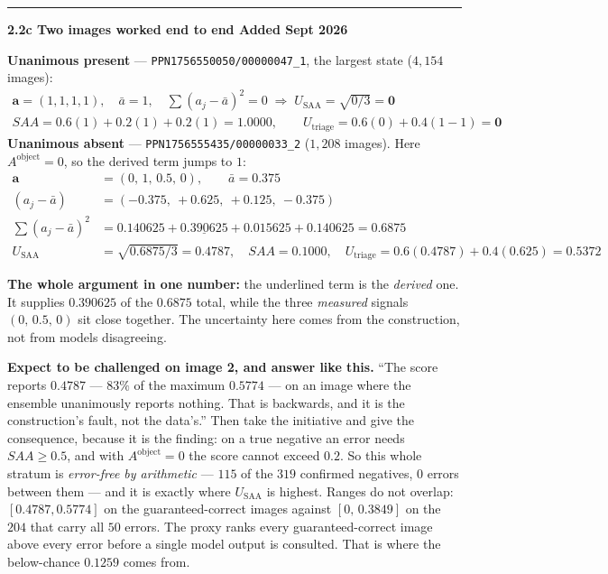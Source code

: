\documentclass[11pt,a4paper]{article}
\newcommand{\status}[1]{\hfill\textcolor{AccentInk}{\small\textbf{#1}}}
\newenvironment{formulacard}[1]
  {\medskip\noindent\rule{\linewidth}{0.6pt}\par\vspace{2pt}\textbf{\large #1}\par\vspace{4pt}}
  {\par\vspace{4pt}}
\newcommand{\notebox}[2]{%
  \par\medskip\noindent
  \colorbox{#1!12}{%
    \begin{minipage}{0.965\linewidth}
    \vspace{2pt}#2\vspace{4pt}
    \end{minipage}%
  }\par\medskip
}
\begin{document}
\begin{formulacard}{2.2c \quad Two images worked end to end \status{Added Sept 2026}}
\textbf{Unanimous present} --- \texttt{PPN1756550050/00000047\_1}, the largest state ($4{,}154$ images):
\begin{align*}
\mathbf a = (1,1,1,1),\quad \bar a = 1,\quad \textstyle\sum(a_j-\bar a)^2 = 0
\;\Rightarrow\; U_{\text{SAA}} = \sqrt{0/3} = \mathbf{0}\\
SAA = 0.6(1)+0.2(1)+0.2(1) = \mathbf{1.0000},\qquad
U_{\text{triage}} = 0.6(0)+0.4(1-1) = \mathbf{0}
\end{align*}
\textbf{Unanimous absent} --- \texttt{PPN1756555435/00000033\_2} ($1{,}208$ images). Here $A^{\text{object}}=0$, so the derived term jumps to $1$:
\begin{align*}
\mathbf a &= (0,\,1,\,0.5,\,0), \qquad \bar a = 0.375\\
(a_j-\bar a) &= (-0.375,\ +0.625,\ +0.125,\ -0.375)\\
\textstyle\sum(a_j-\bar a)^2 &= 0.140625+\underline{\mathbf{0.390625}}+0.015625+0.140625 = 0.6875\\
U_{\text{SAA}} &= \sqrt{0.6875/3} = \mathbf{0.4787}, \quad SAA = \mathbf{0.1000}, \quad
U_{\text{triage}} = 0.6(0.4787)+0.4(0.625) = \mathbf{0.5372}
\end{align*}
\notebox{WarnInk}{\textbf{The whole argument in one number:} the underlined term is the \emph{derived} one. It supplies $0.390625$ of the $0.6875$ total, while the three \emph{measured} signals $(0,\,0.5,\,0)$ sit close together. The uncertainty here comes from the construction, not from models disagreeing.}

\notebox{GoodInk}{\textbf{Expect to be challenged on image 2, and answer like this.} ``The score reports $0.4787$ --- $83\%$ of the maximum $0.5774$ --- on an image where the ensemble unanimously reports nothing. That is backwards, and it is the construction's fault, not the data's.'' Then take the initiative and give the consequence, because it is the finding: on a true negative an error needs $SAA\ge0.5$, and with $A^{\text{object}}=0$ the score cannot exceed $0.2$. So this whole stratum is \emph{error-free by arithmetic} --- $115$ of the $319$ confirmed negatives, $0$ errors between them --- and it is exactly where $U_{\text{SAA}}$ is highest. Ranges do not overlap: $[0.4787, 0.5774]$ on the guaranteed-correct images against $[0,\,0.3849]$ on the $204$ that carry all $50$ errors. The proxy ranks every guaranteed-correct image above every error before a single model output is consulted. That is where the below-chance $0.1259$ comes from.}
\end{formulacard}
\end{document}

